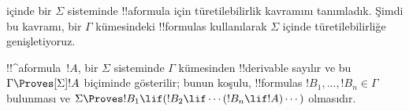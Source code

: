 



 içinde bir $\Sigma$ sisteminde !!a{formula} için
türetilebilirlik kavramını tanımladık. Şimdi bu kavramı, bir $\Gamma$
kümesindeki !!{formula}s kullanılarak $\Sigma$ içinde türetilebilirliğe genişletiyoruz.

\begin{defn}
  !!^a{formula}~$!A$, bir $\Sigma$ sisteminde $\Gamma$ kümesinden
  !!{derivable} sayılır ve bu $\Gamma\Proves[\Sigma]!A$ biçiminde gösterilir;
  bunun koşulu, !!{formula}s $!B_1,\dots,!B_n\in\Gamma$ bulunması ve
  $\Sigma\Proves !B_1\lif(!B_2\lif\cdots(!B_n\lif !A)\cdots)$ olmasıdır.
\end{defn}

